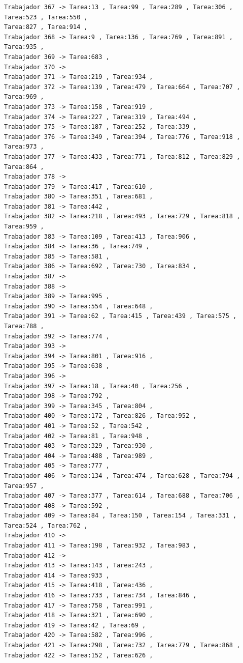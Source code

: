 \documentclass{article}
\begin{document}
\begin{lstlisting}
Trabajador 367 -> Tarea:13 , Tarea:99 , Tarea:289 , Tarea:306 , Tarea:523 , Tarea:550 , 
Tarea:827 , Tarea:914 , 
Trabajador 368 -> Tarea:9 , Tarea:136 , Tarea:769 , Tarea:891 , Tarea:935 , 
Trabajador 369 -> Tarea:683 , 
Trabajador 370 -> 
Trabajador 371 -> Tarea:219 , Tarea:934 , 
Trabajador 372 -> Tarea:139 , Tarea:479 , Tarea:664 , Tarea:707 , Tarea:969 , 
Trabajador 373 -> Tarea:158 , Tarea:919 , 
Trabajador 374 -> Tarea:227 , Tarea:319 , Tarea:494 , 
Trabajador 375 -> Tarea:187 , Tarea:252 , Tarea:339 , 
Trabajador 376 -> Tarea:349 , Tarea:394 , Tarea:776 , Tarea:918 , Tarea:973 , 
Trabajador 377 -> Tarea:433 , Tarea:771 , Tarea:812 , Tarea:829 , Tarea:864 , 
Trabajador 378 -> 
Trabajador 379 -> Tarea:417 , Tarea:610 , 
Trabajador 380 -> Tarea:351 , Tarea:681 , 
Trabajador 381 -> Tarea:442 , 
Trabajador 382 -> Tarea:218 , Tarea:493 , Tarea:729 , Tarea:818 , Tarea:959 , 
Trabajador 383 -> Tarea:109 , Tarea:413 , Tarea:906 , 
Trabajador 384 -> Tarea:36 , Tarea:749 , 
Trabajador 385 -> Tarea:581 , 
Trabajador 386 -> Tarea:692 , Tarea:730 , Tarea:834 , 
Trabajador 387 -> 
Trabajador 388 -> 
Trabajador 389 -> Tarea:995 , 
Trabajador 390 -> Tarea:554 , Tarea:648 , 
Trabajador 391 -> Tarea:62 , Tarea:415 , Tarea:439 , Tarea:575 , Tarea:788 , 
Trabajador 392 -> Tarea:774 , 
Trabajador 393 -> 
Trabajador 394 -> Tarea:801 , Tarea:916 , 
Trabajador 395 -> Tarea:638 , 
Trabajador 396 -> 
Trabajador 397 -> Tarea:18 , Tarea:40 , Tarea:256 , 
Trabajador 398 -> Tarea:792 , 
Trabajador 399 -> Tarea:345 , Tarea:804 , 
Trabajador 400 -> Tarea:172 , Tarea:826 , Tarea:952 , 
Trabajador 401 -> Tarea:52 , Tarea:542 , 
Trabajador 402 -> Tarea:81 , Tarea:948 , 
Trabajador 403 -> Tarea:329 , Tarea:930 , 
Trabajador 404 -> Tarea:488 , Tarea:989 , 
Trabajador 405 -> Tarea:777 , 
Trabajador 406 -> Tarea:134 , Tarea:474 , Tarea:628 , Tarea:794 , Tarea:957 , 
Trabajador 407 -> Tarea:377 , Tarea:614 , Tarea:688 , Tarea:706 , 
Trabajador 408 -> Tarea:592 , 
Trabajador 409 -> Tarea:84 , Tarea:150 , Tarea:154 , Tarea:331 , Tarea:524 , Tarea:762 , 
Trabajador 410 -> 
Trabajador 411 -> Tarea:198 , Tarea:932 , Tarea:983 , 
Trabajador 412 -> 
Trabajador 413 -> Tarea:143 , Tarea:243 , 
Trabajador 414 -> Tarea:933 , 
Trabajador 415 -> Tarea:418 , Tarea:436 , 
Trabajador 416 -> Tarea:733 , Tarea:734 , Tarea:846 , 
Trabajador 417 -> Tarea:758 , Tarea:991 , 
Trabajador 418 -> Tarea:321 , Tarea:690 , 
Trabajador 419 -> Tarea:42 , Tarea:69 , 
Trabajador 420 -> Tarea:582 , Tarea:996 , 
Trabajador 421 -> Tarea:298 , Tarea:732 , Tarea:779 , Tarea:868 , 
Trabajador 422 -> Tarea:152 , Tarea:626 , 

\end{lstlisting}
\end{document}
